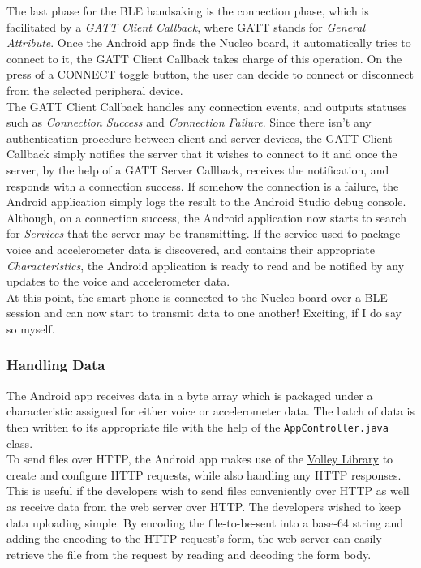 The last phase for the BLE handsaking is the connection phase, which is facilitated by a \textit{GATT Client Callback}, where GATT stands for \textit{General Attribute}. Once the Android app finds the Nucleo board, it automatically tries to connect to it, the GATT Client Callback takes charge of this operation. On the press of a CONNECT toggle button, the user can decide to connect or disconnect from the selected peripheral device.\\

The GATT Client Callback handles any connection events, and outputs statuses such as \textit{Connection Success} and \textit{Connection Failure}. Since there isn't any authentication procedure between client and server devices, the GATT Client Callback simply notifies the server that it wishes to connect to it and once the server, by the help of a GATT Server Callback, receives the notification, and responds with a connection success. If somehow the connection is a failure, the Android application simply logs the result to the Android Studio debug console. Although, on a connection success, the Android application now starts to search for \textit{Services} that the server may be transmitting. If the service used to package voice and accelerometer data is discovered, and contains their appropriate \textit{Characteristics}, the Android application is ready to read and be notified by any updates to the voice and accelerometer data.\\

At this point, the smart phone is connected to the Nucleo board over a BLE session and can now start to transmit data to one another! Exciting, if I do say so myself.

\subsubsection{Handling Data}

The Android app receives data in a byte array which is packaged under a characteristic assigned for either voice or accelerometer data. The batch of data is then written to its appropriate file with the help of the \texttt{AppController.java} class.\\

To send files over HTTP, the Android app makes use of the \href{https://developer.android.com/training/volley/index.html}{Volley Library} to create and configure HTTP requests, while also handling any HTTP responses. This is useful if the developers wish to send files conveniently over HTTP as well as receive data from the web server over HTTP. The developers wished to keep data uploading simple. By encoding the file-to-be-sent into a base-64 string and adding the encoding to the HTTP request's form, the web server can easily retrieve the file from the request by reading and decoding the form body.

